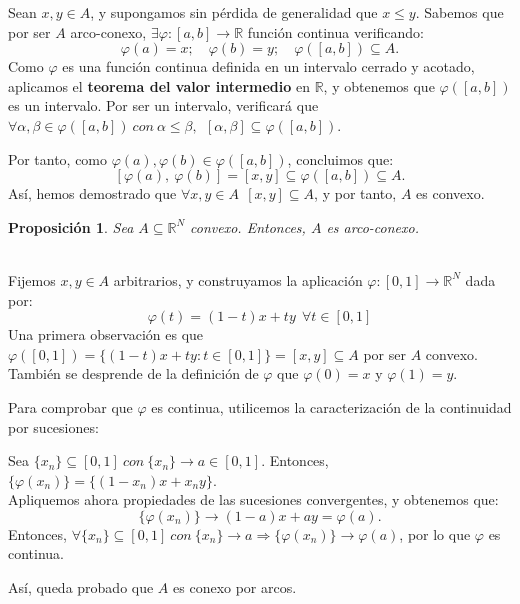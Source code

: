 \documentclass[11pt, a4paper, titlepage]{article}
\makeatletter
\renewenvironment{proof}[1][\proofname] {\vspace{-15pt}\par\pushQED{\qed}\normalfont\topsep6\p@\@plus6\p@\relax\trivlist\item[\hskip\labelsep\it#1\@addpunct{.}]\ignorespaces}{\popQED\endtrivlist\@endpefalse}
\theoremstyle{theorem-style}
\newtheorem*{nprop}{Proposición}
\theoremstyle{definition-style}
\theoremstyle{remark-style}
\theoremstyle{example-style}
\makeatother
\begin{document}
\begin{proof}
Sean $x,y \in A$, y supongamos sin pérdida de generalidad que $x \le y$. Sabemos que por ser $A$ arco-conexo, $\exists \varphi : [a,b] \longrightarrow \mathbb{R}$ función continua verificando: $$\varphi(a) = x;\quad \varphi(b) = y;\quad \varphi([a,b]) \subseteq A.$$
Como $\varphi$ es una función continua definida en un intervalo cerrado y acotado, aplicamos el \textbf{teorema del valor intermedio} en $\mathbb{R}$, y obtenemos que $\varphi([a,b])$ es un intervalo. Por ser un intervalo, verificará que $\forall \alpha, \beta \in \varphi([a,b])\ con\ \alpha \le \beta,\ \ [\alpha,\beta] \subseteq \varphi([a,b])$.

Por tanto, como $\varphi(a), \varphi(b) \in \varphi([a,b])$, concluimos que: $$[\varphi(a),\ \varphi(b)] = [x,y] \subseteq \varphi([a,b]) \subseteq A.$$
Así, hemos demostrado que $\forall x,y \in A\ \ [x,y] \subseteq A$, y por tanto, $A$ es convexo.
\end{proof}



\begin{nprop}
Sea $A \subseteq \mathbb{R}^N$ convexo. Entonces, $A$ es arco-conexo.
\end{nprop}

\begin{proof} \hfill \\
Fijemos $x,y \in A$ arbitrarios, y construyamos la aplicación $\varphi: [0,1] \longrightarrow \mathbb{R}^N$ dada por: $$\varphi(t) = (1-t)x + ty\ \ \forall t\in [0,1]$$
Una primera observación es que $\varphi([0,1]) = \{(1-t)x + ty: t \in [0,1]\} = [x,y] \subseteq A$ por ser $A$ convexo. También se desprende de la definición de $\varphi$ que $\varphi(0) = x$ y $\varphi(1) = y$.

Para comprobar que $\varphi$ es continua, utilicemos la caracterización de la continuidad por sucesiones:

Sea $\{x_n\} \subseteq [0,1]\ con\ \{x_n\} \rightarrow a \in [0,1]$. Entonces, $\{\varphi(x_n) \} = \{(1- x_n)x + x_n y\}$. \\Apliquemos ahora propiedades de las sucesiones convergentes, y obtenemos que: $$\{\varphi(x_n) \} \rightarrow (1-a)x + ay = \varphi(a).$$
Entonces, $\forall \{x_n\} \subseteq [0,1]\ con\ \{x_n\} \rightarrow a \Rightarrow \{\varphi(x_n) \} \rightarrow \varphi(a)$, por lo que $\varphi$ es continua.

Así, queda probado que $A$ es conexo por arcos.
\end{proof}
\end{document}
